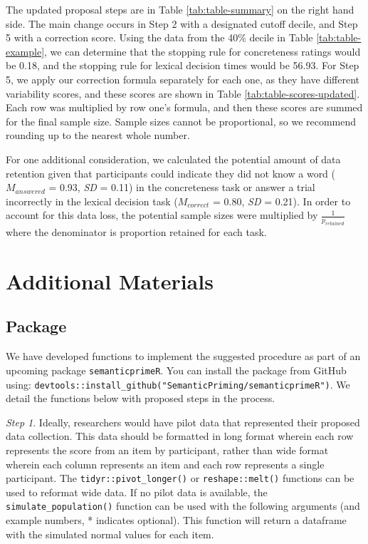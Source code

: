 \documentclass[
  man]{apa7}
\begin{document}
The updated proposal steps are in Table \ref{tab:table-summary} on the right hand side. The main change occurs in Step 2 with a designated cutoff decile, and Step 5 with a correction score. Using the data from the 40\% decile in Table \ref{tab:table-example}, we can determine that the stopping rule for concreteness ratings would be 0.18, and the stopping rule for lexical decision times would be 56.93. For Step 5, we apply our correction formula separately for each one, as they have different variability scores, and these scores are shown in Table \ref{tab:table-scores-updated}. Each row was multiplied by row one's formula, and then these scores are summed for the final sample size. Sample sizes cannot be proportional, so we recommend rounding up to the nearest whole number.

For one additional consideration, we calculated the potential amount of data retention given that participants could indicate they did not know a word (\(M_{answered}\) = 0.93, \emph{SD} = 0.11) in the concreteness task or answer a trial incorrectly in the lexical decision task (\(M_{correct}\) = 0.80, \emph{SD} = 0.21). In order to account for this data loss, the potential sample sizes were multiplied by \(\frac{1}{p_{retained}}\) where the denominator is proportion retained for each task.

\hypertarget{additional-materials}{%
\section{Additional Materials}\label{additional-materials}}

\hypertarget{package}{%
\subsection{Package}\label{package}}

We have developed functions to implement the suggested procedure as part of an upcoming package \texttt{semanticprimeR}. You can install the package from GitHub using: \texttt{devtools::install\_github("SemanticPriming/semanticprimeR")}. We detail the functions below with proposed steps in the process.

\emph{Step 1}. Ideally, researchers would have pilot data that represented their proposed data collection. This data should be formatted in long format wherein each row represents the score from an item by participant, rather than wide format wherein each column represents an item and each row represents a single participant. The \texttt{tidyr::pivot\_longer()} or \texttt{reshape::melt()} functions can be used to reformat wide data. If no pilot data is available, the \texttt{simulate\_population()} function can be used with the following arguments (and example numbers, * indicates optional). This function will return a dataframe with the simulated normal values for each item.
\end{document}
